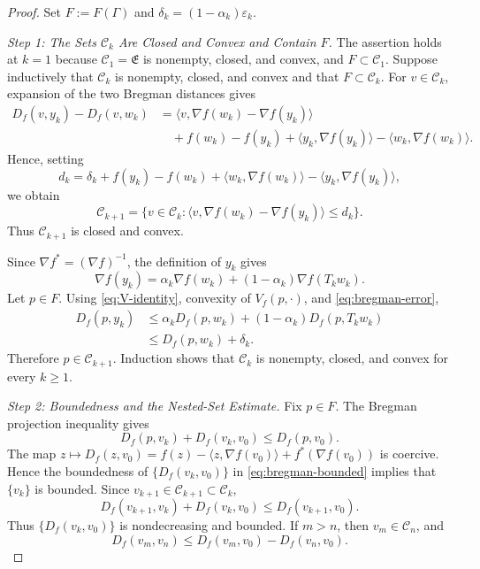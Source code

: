 \documentclass[leqno,12pt]{amsart}
\theoremstyle{definition}
\theoremstyle{remark}
\numberwithin{equation}{section}
\newcommand{\E}{\mathfrak{E}}
\newcommand{\C}{\mathscr{C}}
\begin{document}
\begin{proof}
Set $F:=F(\Gamma)$ and $\delta_k=(1-\alpha_k)\varepsilon_k$.

\smallskip
\noindent\emph{Step 1: The Sets $\C_k$ Are Closed and Convex and Contain $F$.}
The assertion holds at $k=1$ because $\C_1=\E$ is nonempty, closed, and convex, and $F\subset\C_1$. Suppose inductively that $\C_k$ is nonempty, closed, and convex and that $F\subset\C_k$. For $v\in\C_k$, expansion of the two Bregman distances gives
\begin{align*}
 D_f(v,y_k)-D_f(v,w_k)
 &=\langle v,\nabla f(w_k)-\nabla f(y_k)\rangle\\
 &\quad+f(w_k)-f(y_k)
 +\langle y_k,\nabla f(y_k)\rangle
 -\langle w_k,\nabla f(w_k)\rangle.
\end{align*}
Hence, setting
\[
 d_k=\delta_k+f(y_k)-f(w_k)
 +\langle w_k,\nabla f(w_k)\rangle
 -\langle y_k,\nabla f(y_k)\rangle,
\]
we obtain
\begin{equation}\label{eq:bregman-halfspace}
 \C_{k+1}
 =\{v\in\C_k:\langle v,\nabla f(w_k)-\nabla f(y_k)\rangle\leq d_k\}.
\end{equation}
Thus $\C_{k+1}$ is closed and convex.

Since $\nabla f^*=(\nabla f)^{-1}$, the definition of $y_k$ gives
\[
 \nabla f(y_k)
 =\alpha_k\nabla f(w_k)+(1-\alpha_k)\nabla f(T_kw_k).
\]
Let $p\in F$. Using \eqref{eq:V-identity}, convexity of $V_f(p,\cdot)$, and \eqref{eq:bregman-error},
\begin{align*}
 D_f(p,y_k)
 &\leq \alpha_kD_f(p,w_k)+(1-\alpha_k)D_f(p,T_kw_k)\\
 &\leq D_f(p,w_k)+\delta_k.
\end{align*}
Therefore $p\in\C_{k+1}$. Induction shows that $\C_k$ is nonempty, closed, and convex for every $k\geq1$.

\smallskip
\noindent\emph{Step 2: Boundedness and the Nested-Set Estimate.}
Fix $p\in F$. The Bregman projection inequality gives
\begin{equation}\label{eq:bregman-bounded}
 D_f(p,v_k)+D_f(v_k,v_0)\leq D_f(p,v_0).
\end{equation}
The map $z\mapsto D_f(z,v_0)=f(z)-\langle z,\nabla f(v_0)\rangle+f^*(\nabla f(v_0))$ is coercive. Hence the boundedness of $\{D_f(v_k,v_0)\}$ in \eqref{eq:bregman-bounded} implies that $\{v_k\}$ is bounded. Since $v_{k+1}\in\C_{k+1}\subset\C_k$,
\[
 D_f(v_{k+1},v_k)+D_f(v_k,v_0)\leq D_f(v_{k+1},v_0).
\]
Thus $\{D_f(v_k,v_0)\}$ is nondecreasing and bounded. If $m>n$, then $v_m\in\C_n$, and
\begin{equation}\label{eq:bregman-nested}
 D_f(v_m,v_n)
 \leq D_f(v_m,v_0)-D_f(v_n,v_0).
\end{equation}


\end{proof}
\end{document}
